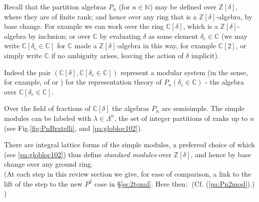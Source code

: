 \documentclass[reqno,10pt,a4paper]{amsart}
\newcommand{\C}{\mathbb{C}}
\newcommand{\N}{\mathbb{N}}
\newcommand{\Z}{\mathbb{Z}}
\newcommand{\ppmx}[1]{}
\newcommand{\ppmy}[1]{}   %
\newcommand{\confer}[1]{$\;$(Cf. (#1).)}  %
\begin{document}
\newcommand{\Cdelta}{\C[\delta_c\in \C]} %

Recall that the partition algebras $P_n$ 
(for $n \in \N$)
may be defined over $\Z[\delta]$, where they are of finite rank; and hence over any ring that is a $\Z[\delta]$-algebra, by base change.
For example we can work over the ring $\C[\delta]$, 
which is a $\Z[\delta]$-algebra by inclusion; 
or over $\C$ by evaluating
$\delta$ as some element $\delta_c\in\C$
(we may write   %
$\Cdelta$ 
for $\C$ made a $\Z[\delta]$-algebra in this way, 
for example $\C[2]$,
or simply write $\C$ if no ambiguity arises, leaving the action of $\delta$ implicit). 

\ppmx{[just around here is where the standard modules are defined. this is one of the things that we will parallel for the tonal case, so perhaps this should be highlighted more clearly - so that explicit reference to this part can be made later. - and then explicitly paralleled in the tonal case. (BTW, I note that here it says very explicitly that qh will not be used.)]}

Indeed 
the pair 
$(\C[\delta],  \Cdelta )$
represent a modular system 
(in the sense, for example, of %
\cite{CurtisReiner62} or \cite[\S1.9]{Benson95})
for the 
representation theory of 
$P_n(\delta_c\in\C)$ - the algebra over 
$ \Cdelta $.    %

\ppmy{[A copy of Pn-Brat-fig  was %
invoked here (it is labeled as fig:PnBratelli, which unpacks as \ref{fig:PnBratelli}, due to the later duplicate, but here becomes Fig.1). But without comment! And it is still duplicated later! Need to resolve this. Perhaps put the fig in Intro somehow -- now DONE! (as PnBratFig.tex) -- and remove other instances?]}



\mdef \label{lem:ss01}
Over the field of fractions of 
$\C[\delta]$
the algebras $P_n$ are semisimple. 
The simple modules can be labeled with $\lambda\in \Lambda^n$, the set of integer partitions of ranks up to $n$
(see
Fig.\ref{fig:PnBratelli}, 
and
\ref{pa:globloc102}).
\ppmy{[--maybe rearrange so   \ref{pa:globloc102} arrives here-ish??]}
There are integral lattice forms
of the simple modules,
a preferred choice of 
which 
(see \ref{pa:globloc102})
thus define
{\em standard modules} 
over $\Z[\delta]$, and hence by base change over any ground ring.
%
$\;$ 
\\
(At each step in this 
review
section we  %
give, for ease of comparison, a link to the lift of the step  %
to the 
new
$P^2$ case in \S\ref{ss:2tonal}. Here then:
\confer{\ref{pa:Pn2mod}}
)
\end{document}
